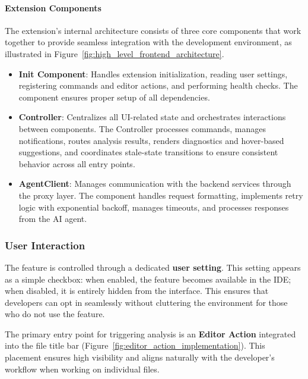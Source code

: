 \begin{spacing}{1.2}
\paragraph{Extension Components}
The extension's internal architecture consists of three core components that work together to provide seamless integration with the development environment, as illustrated in Figure~\ref{fig:high_level_frontend_architecture}.

\begin{itemize}
    \item \textbf{Init Component}: Handles extension initialization, reading user settings, registering commands and editor actions, and performing health checks. The component ensures proper setup of all dependencies.

    \item \textbf{Controller}: Centralizes all UI-related state and orchestrates interactions between components. The Controller processes commands, manages notifications, routes analysis results, renders diagnostics and hover-based suggestions, and coordinates stale-state transitions to ensure consistent behavior across all entry points.

    \item \textbf{AgentClient}: Manages communication with the backend services through the proxy layer. The component handles request formatting, implements retry logic with exponential backoff, manages timeouts, and processes responses from the AI agent.
\end{itemize}

\subsubsection{User Interaction}
The feature is controlled through a dedicated \textbf{user setting}. This setting appears as a simple checkbox: when enabled, the feature becomes available in the IDE; when disabled, it is entirely hidden from the interface. This ensures that developers can opt in seamlessly without cluttering the environment for those who do not use the feature.

The primary entry point for triggering analysis is an \textbf{Editor Action} integrated into the file title bar (Figure~\ref{fig:editor_action_implementation}). This placement ensures high visibility and aligns naturally with the developer’s workflow when working on individual files.


\end{spacing}
